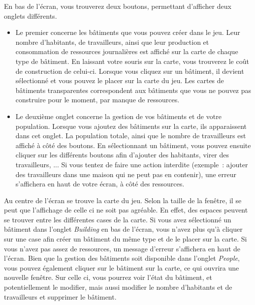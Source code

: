 \documentclass{article}
\begin{document}
En bas de l'écran, vous trouverez deux boutons, permettant d'afficher deux onglets différents.
\begin{itemize}
\item Le premier concerne les bâtiments que vous pouvez créer dans le jeu. Leur nombre d'habitants, de travailleurs,
ainsi que leur production et consommation de ressources journalières est affiché sur la carte de chaque type de bâtiment.
En laissant votre souris sur la carte, vous trouverez le coût de construction de celui-ci.
Lorsque vous cliquez sur un bâtiment, il devient sélectionné et vous pouvez le placer sur la carte du jeu.
Les cartes de bâtiments transparentes correspondent aux bâtiments que vous ne pouvez pas construire pour le moment,
par manque de ressources.
\item Le deuxième onglet concerne la gestion de vos bâtiments et de votre population. Lorsque vous ajoutez
des bâtiments sur la carte, ils apparaissent dans cet onglet. La population totale, ainsi que
le nombre de travailleurs est affiché à côté des boutons. En sélectionnant un bâtiment, vous pouvez ensuite
cliquer sur les différents boutons afin d'ajouter des habitants, virer des travailleurs, ...
Si vous tentez de faire une action interdite (exemple : ajouter des travailleurs dans une maison qui ne peut pas en contenir),
une erreur s'affichera en haut de votre écran, à côté des ressources.
\end{itemize}

Au centre de l'écran se trouve la carte du jeu. Selon la taille de la fenêtre, il se peut
que l'affichage de celle ci ne soit pas agréable. En effet, des espaces peuvent se trouver
entre les différentes cases de la carte.
Si vous avez sélectionné un bâtiment dans l'onglet \textit{Building} en bas de l'écran, vous n'avez plus qu'à cliquer sur une case
afin créer un bâtiment du même type et de le placer sur la carte. Si vous n'avez pas assez de ressources,
un message d'erreur s'affichera en haut de l'écran. Bien que la gestion des bâtiments soit disponible
dans l'onglet \textit{People}, vous pouvez également cliquer sur le bâtiment sur la carte, ce qui ouvrira une 
nouvelle fenêtre. Sur celle ci, vous pourrez voir l'état du bâtiment, et potentiellement le modifier, mais aussi modifier le nombre
d'habitants et de travailleurs et supprimer le bâtiment.
\end{document}
